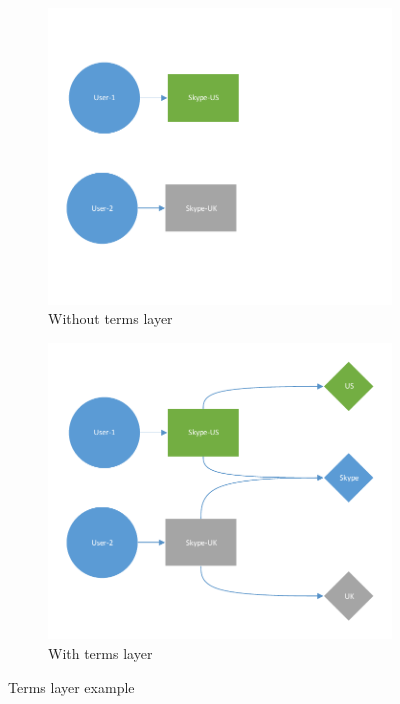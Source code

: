 \documentclass[11pt,oneside]{book}
\begin{document}
\begin{figure}[h]
\centering
\begin{subfigure}[b]{0.49\textwidth}
	\centering
	\includegraphics[width=\textwidth]{figures/skype_exampe1.pdf}
	\caption{Without terms layer}
	\label{fig:skype-no-terms}
\end{subfigure}
\begin{subfigure}[b]{0.49\textwidth}
	\centering
	\includegraphics[width=\textwidth]{figures/skype_exampe2.pdf}
	\caption{With terms layer}
	\label{fig:skype-with-terms}
\end{subfigure}
	\caption{Terms layer example}
	\label{fig:terms_layer}
\end{figure}
\end{document}
